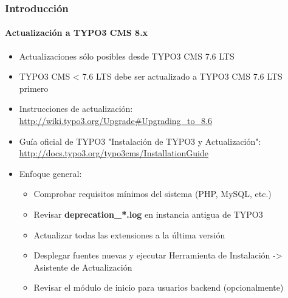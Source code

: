 \begin{frame}[fragile]
	\frametitle{Introducción}
	\framesubtitle{Actualización a TYPO3 CMS 8.x}

	\begin{itemize}
		\item Actualizaciones sólo posibles desde TYPO3 CMS 7.6 LTS
		\item TYPO3 CMS < 7.6 LTS debe ser actualizado a TYPO3 CMS 7.6 LTS primero
	\end{itemize}

	\begin{itemize}

		\item Instrucciones de actualización:\newline
			\smaller\url{http://wiki.typo3.org/Upgrade#Upgrading_to_8.6}\normalsize
		\item Guía oficial de TYPO3 "Instalación de TYPO3 y Actualización":
			\smaller\url{http://docs.typo3.org/typo3cms/InstallationGuide}\normalsize
		\item Enfoque general:
			\begin{itemize}

				\item Comprobar requisitos mínimos del sistema \small(PHP, MySQL, etc.)
				\item Revisar \textbf{deprecation\_*.log} en instancia antigua de TYPO3
				\item Actualizar todas las extensiones a la última versión
				\item Desplegar fuentes nuevas y ejecutar Herramienta de Instalación -> Asistente de Actualización
				\item Revisar el módulo de inicio para usuarios backend (opcionalmente)
			\end{itemize}
	\end{itemize}

\end{frame}


